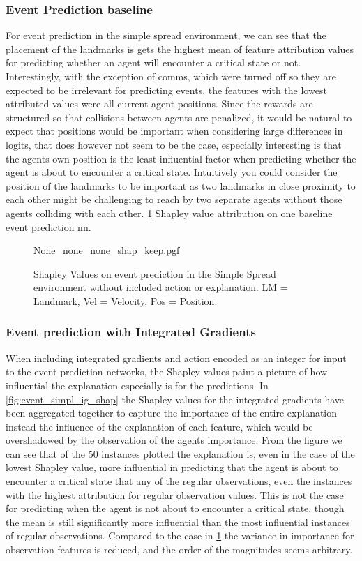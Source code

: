 \documentclass[UKenglish]{uiomasterthesis}
\begin{document}
\subsubsection{Event Prediction baseline}
For event prediction in the simple spread environment, we can see that the placement of the landmarks is gets the highest mean of feature attribution values for predicting whether an agent will encounter a critical state or not. Interestingly, with the exception of comms, which were turned off so they are expected to be irrelevant for predicting events, the features with the lowest attributed values were all current agent positions. Since the rewards are structured so that collisions between agents are penalized, it would be natural to expect that positions would be important when considering large differences in logits, that does however not seem to be the case, especially interesting is that the agents own position is the least influential factor when predicting whether the agent is about to encounter a critical state. Intuitively you could consider the position of the landmarks to be important as two landmarks in close proximity to each other might be challenging to reach by two separate agents without those agents colliding with each other. \cref{fig:event_simpl_shap} Shapley value attribution on one baseline event prediction \ac{nn}.


\begin{figure}[H]
\centering
{None_none_none_shap_keep.pgf}
\caption{Shapley Values on event prediction in the Simple Spread environment without included action or explanation. LM = Landmark, Vel = Velocity, Pos = Position.}
\label{fig:event_simpl_shap}
\end{figure}

\subsubsection{Event prediction with Integrated Gradients}
When including integrated gradients and action encoded as an integer for input to the event prediction networks, the Shapley values paint a picture of how influential the explanation especially is for the predictions. In \cref{fig:event_simpl_ig_shap} the Shapley values for the integrated gradients have been aggregated together to capture the importance of the entire explanation instead the influence of the explanation of each feature, which would be overshadowed by the observation of the agents importance. From the figure we can see that of the 50 instances plotted the explanation is, even in the case of the lowest Shapley value, more influential in predicting that the agent is about to encounter a critical state that any of the regular observations, even the instances with the highest attribution for regular observation values. This is not the case for predicting when the agent is not about to encounter a critical state, though the mean is still significantly more influential than the most influential instances of regular observations. Compared to the case in \cref{fig:event_simpl_shap} the variance in importance for observation features is reduced, and the order of the magnitudes seems arbitrary.
\end{document}
